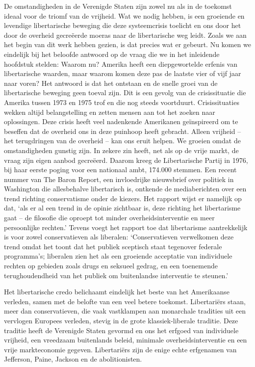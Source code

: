 \documentclass[
  a5paper,
  smalldemyvopaper,10pt,twoside,onecolumn,openright,extrafontsizes,hidelinks]{memoir}
\begin{document}
De omstandigheden in de Verenigde Staten zijn zowel nu als in de
toekomst ideaal voor de triomf van de vrijheid. Wat we nodig hebben, is
een groeiende en levendige libertarische beweging die deze systeemcrisis
toelicht en ons door het door de overheid gecreëerde moeras naar de
libertarische weg leidt. Zoals we aan het begin van dit werk hebben
gezien, is dat precies wat er gebeurt. Nu komen we eindelijk bij het
beloofde antwoord op de vraag die we in het inleidende hoofdstuk
stelden: Waarom nu? Amerika heeft een diepgewortelde erfenis van
libertarische waarden, maar waarom komen deze pas de laatste vier of
vijf jaar naar voren? Het antwoord is dat het ontstaan en de snelle
groei van de libertarische beweging geen toeval zijn. Dit is een gevolg
van de crisissituatie die Amerika tussen 1973 en 1975 trof en die nog
steeds voortduurt. Crisissituaties wekken altijd belangstelling en
zetten mensen aan tot het zoeken naar oplossingen. Deze crisis heeft
veel nadenkende Amerikanen geïnspireerd om te beseffen dat de overheid
ons in deze puinhoop heeft gebracht. Alleen vrijheid -- het terugdringen
van de overheid -- kan ons eruit helpen. We groeien omdat de
omstandigheden gunstig zijn. In zekere zin heeft, net als op de vrije
markt, de vraag zijn eigen aanbod gecreëerd. Daarom kreeg de
Libertarische Partij in 1976, bij haar eerste poging voor een nationaal
ambt, 174.000 stemmen. Een recent nummer van The Baron Report, een
invloedrijke nieuwsbrief over politiek in Washington die allesbehalve
libertarisch is, ontkende de mediaberichten over een trend richting
conservatisme onder de kiezers. Het rapport wijst er namelijk op dat,
`als er al een trend in de opinie zichtbaar is, deze richting het
libertarisme gaat -- de filosofie die oproept tot minder
overheidsinterventie en meer persoonlijke rechten.' Tevens voegt het
rapport toe dat libertarisme aantrekkelijk is voor zowel conservatieven
als liberalen: `Conservatieven verwelkomen deze trend omdat het toont
dat het publiek sceptisch staat tegenover federale programma's;
liberalen zien het als een groeiende acceptatie van individuele rechten
op gebieden zoals drugs en seksueel gedrag, en een toenemende
terughoudendheid van het publiek om buitenlandse interventie te
steunen.'

Het libertarische credo belichaamt eindelijk het beste van het
Amerikaanse verleden, samen met de belofte van een veel betere toekomst.
Libertariërs staan, meer dan conservatieven, die vaak vastklampen aan
monarchale tradities uit een vervlogen Europees verleden, stevig in de
grote klassiek-liberale traditie. Deze traditie heeft de Verenigde
Staten gevormd en ons het erfgoed van individuele vrijheid, een
vreedzaam buitenlands beleid, minimale overheidsinterventie en een vrije
markteconomie gegeven. Libertariërs zijn de enige echte erfgenamen van
Jefferson, Paine, Jackson en de abolitionisten.
\end{document}
